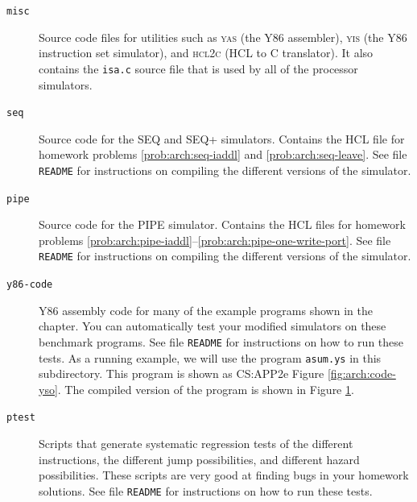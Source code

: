 \documentclass[11pt]{article}
\begin{document}
\begin{description}
\item[\texttt{misc}]

Source code files for utilities such as \textsc{yas} (the Y86
assembler), \textsc{yis} (the Y86 instruction set simulator), and
\textsc{hcl2c} (HCL to C translator).  
It also contains the {\tt isa.c} source file that is  used by all of the 
processor simulators.

\item[\texttt{seq}]

Source code for the SEQ and SEQ+ simulators.  Contains the HCL file
for homework problems \ref{prob:arch:seq-iaddl} and
\ref{prob:arch:seq-leave}.  
See file \texttt{README} for instructions 
on compiling the different versions of the simulator.


\item[\texttt{pipe}]

Source code for the PIPE simulator.
Contains the HCL files for homework problems
\ref{prob:arch:pipe-iaddl}--\ref{prob:arch:pipe-one-write-port}.  See
file \texttt{README} for instructions on compiling the different
versions of the simulator.

\item[\texttt{y86-code}]

Y86 assembly code for many of the example programs shown in the
chapter.  You can automatically test your modified simulators on these
benchmark programs.  See file \texttt{README} for instructions on how
to run these tests.  As a running example, we will use the program
\texttt{asum.ys} in this subdirectory.  This program is shown as
CS:APP2e Figure \ref{fig:arch:code-yso}.  The compiled version of the
program is shown in Figure \ref{fig:sim:code-yso}.

\item[\texttt{ptest}]
Scripts that generate systematic regression tests of the different
instructions, the different jump possibilities, and different hazard
possibilities.  These scripts are very good at finding bugs in your
homework solutions.
See file \texttt{README} for instructions on how to run these tests.
\end{description}

\begin{figure}
\begin{ccode}

\end{ccode}
\label{fig:sim:code-yso}
\end{figure}
\end{document}

